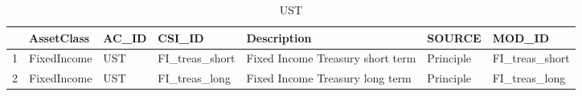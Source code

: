 \begin{longtable}{rllllll}
\caption{UST} \\ 
  \hline
 & AssetClass & AC\_ID & CSI\_ID & Description & SOURCE & MOD\_ID \\ 
  \hline
1 & FixedIncome & UST & FI\_treas\_short & Fixed Income Treasury short term & Principle & FI\_treas\_short \\ 
  2 & FixedIncome & UST & FI\_treas\_long & Fixed Income Treasury long term & Principle & FI\_treas\_long \\ 
   \hline
\hline
\end{longtable}
